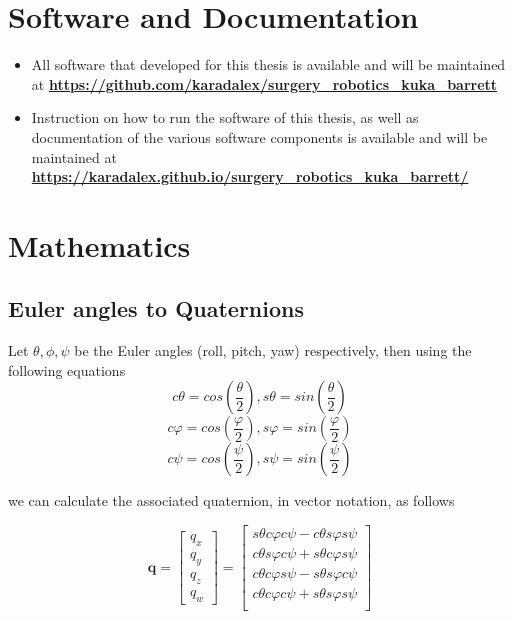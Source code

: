 \section{Software and Documentation}

\begin{itemize}
\item All software that developed for this thesis is available and will be maintained at \textbf{\url{https://github.com/karadalex/surgery_robotics_kuka_barrett}}
\item Instruction on how to run the software of this thesis, as well as documentation of the various software components is available and will be maintained at 
	\textbf{\url{https://karadalex.github.io/surgery_robotics_kuka_barrett/}}
\end{itemize}

\section{Mathematics}

\subsection{Euler angles to Quaternions}

Let $\theta, \phi, \psi$ be the Euler angles (roll, pitch, yaw) respectively, then using the following equations
\[
cθ = cos\left( \frac{θ}{2} \right) , sθ = sin\left( \frac{θ}{2} \right)
\]
\[
cφ = cos\left( \frac{φ}{2} \right) , sφ = sin\left( \frac{φ}{2} \right)
\]
\[
cψ = cos\left( \frac{ψ}{2} \right) , sψ = sin\left( \frac{ψ}{2} \right)
\]

we can calculate the associated quaternion, in vector notation, as follows

\[
\mathbf{q} = \begin{bmatrix} q_x \\ q_y \\ q_z \\ q_w \end{bmatrix} = \begin{bmatrix}
sθcφcψ - cθsφsψ \\
cθsφcψ + sθcφsψ \\
cθcφsψ - sθsφcψ \\
cθcφcψ + sθsφsψ \\
\end{bmatrix}
\]
